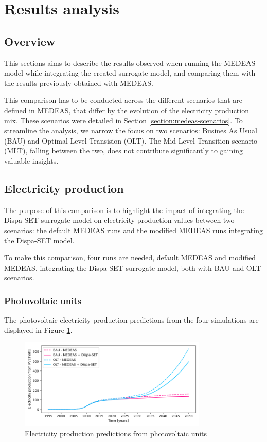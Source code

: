 \section{Results analysis}

\subsection{Overview}

This sections aims to describe the results observed when running the MEDEAS model while integrating the created surrogate model, and comparing them with the results previously obtained with MEDEAS.

This comparison has to be conducted across the different scenarios that are defined in MEDEAS, that differ by the evolution of the electricity production mix. These scenarios were detailed in Section \ref{section:medeas-scenarios}. To streamline the analysis, we narrow the focus on two scenarios: Busines As Usual (BAU) and Optimal Level Transision (OLT). The Mid-Level Transition scenario (MLT), falling between the two, does not contribute significantly to gaining valuable insights.

\subsection{Electricity production}

The purpose of this comparison is to highlight the impact of integrating the Dispa-SET surrogate model on electricity production values between two scenarios: the default MEDEAS runs and the modified MEDEAS runs integrating the Dispa-SET model.

To make this comparison, four runs are needed, default MEDEAS and modified MEDEAS, integrating the Dispa-SET surrogate model, both with BAU and OLT scenarios.

\subsubsection{Photovoltaic units}

The photovoltaic electricity production predictions from the four simulations are displayed in Figure \ref{fig:electricity-production-PV}.

\begin{figure}[h]
    \centering
    \includegraphics[width=0.8\textwidth]{resources/images/electricity-production_PV.png}
    \caption{Electricity production predictions from photovoltaic units}
    \label{fig:electricity-production-PV}
\end{figure}

